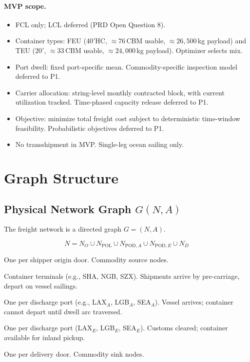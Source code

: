 \documentclass[11pt,a4paper]{article}
\theoremstyle{definition}
\begin{document}
\paragraph{MVP scope.}
\begin{itemize}[noitemsep]
  \item FCL only; LCL deferred (PRD Open Question 8).
  \item Container types: FEU (40$'$HC, $\approx 76$\,CBM usable, $\approx 26{,}500$\,kg payload) and TEU
        (20$'$, $\approx 33$\,CBM usable, $\approx 24{,}000$\,kg payload). Optimizer selects mix.
  \item Port dwell: fixed port-specific mean. Commodity-specific inspection model deferred to P1.
  \item Carrier allocation: string-level monthly contracted block, with current utilization tracked.
        Time-phased capacity release deferred to P1.
  \item Objective: minimize total freight cost subject to deterministic time-window feasibility.
        Probabilistic objectives deferred to P1.
  \item No transshipment in MVP. Single-leg ocean sailing only.
\end{itemize}

\section{Graph Structure}

\subsection{Physical Network Graph \texorpdfstring{$G(N, A)$}{G(N,A)}}

The freight network is a directed graph $G = (N, A)$.

\[
  N = N_O \cup N_{\text{POL}} \cup N_{\text{POD},A} \cup N_{\text{POD},E} \cup N_D
\]

\begin{description}[leftmargin=3.2cm, labelwidth=3cm, style=nextline]
  \item[$N_O$ — Origins] One per shipper origin door. Commodity source nodes.
  \item[$N_{\text{POL}}$ — Ports of Loading] Container terminals (e.g., SHA, NGB, SZX). Shipments
        arrive by pre-carriage, depart on vessel sailings.
  \item[$N_{\text{POD},A}$ — POD Arrival] One per discharge port (e.g., LAX$_A$, LGB$_A$, SEA$_A$).
        Vessel arrives; container cannot depart until dwell arc traversed.
  \item[$N_{\text{POD},E}$ — POD Exit] One per discharge port (LAX$_E$, LGB$_E$, SEA$_E$).
        Customs cleared; container available for inland pickup.
  \item[$N_D$ — Destinations] One per delivery door. Commodity sink nodes.
\end{description}
\end{document}
